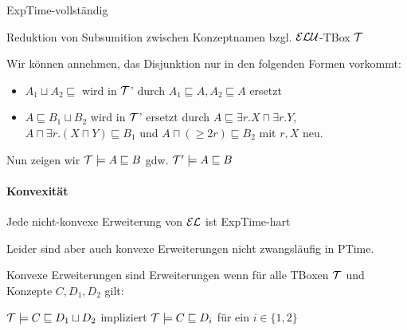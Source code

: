 ExpTime-vollständig

Reduktion von Subsumition zwischen Konzeptnamen bzgl. $\mathcal{E}\mathcal{L}\mathcal{U}$-TBox $\mathcal{T}$

Wir können annehmen, das Disjunktion nur in den folgenden Formen vorkommt:

\begin{itemize}
	\item $A_1 \sqcup A_2 \sqsubseteq$ wird in $\mathcal{T}$' durch $A_1 \sqsubseteq A, A_2 \sqsubseteq A$ ersetzt
	\item $A \sqsubseteq B_1 \sqcup B_2$ wird in $\mathcal{T}$' ersetzt durch $A \sqsubseteq \exists r.X \sqcap \exists r.Y$, $A \sqcap \exists r.(X \sqcap Y) \sqsubseteq B_1$ und $A \sqcap (\geq 2 r) \sqsubseteq B_2$ mit $r,X$ neu.
\end{itemize}

Nun zeigen wir $\mathcal{T} \models A \sqsubseteq B$ gdw. $\mathcal{T}' \models A \sqsubseteq B$

\paragraph{Konvexität}

Jede nicht-konvexe Erweiterung von $\mathcal{E}\mathcal{L}$ ist ExpTime-hart

Leider sind aber auch konvexe Erweiterungen nicht zwangsläufig in PTime.

Konvexe Erweiterungen sind Erweiterungen wenn für alle TBoxen $\mathcal{T}$ und Konzepte $C,D_1,D_2$ gilt:

$\mathcal{T} \models C \sqsubseteq D_1 \sqcup D_2$ impliziert $\mathcal{T} \models C \sqsubseteq D_i$ für ein $i \in \{1,2\}$
